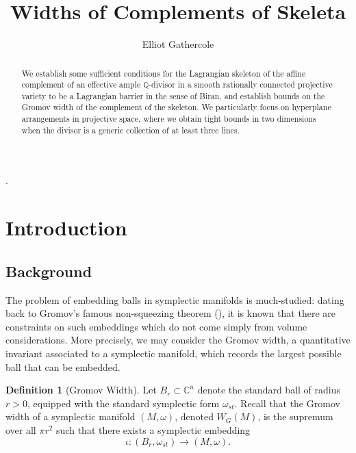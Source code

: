 \documentclass{article}
\title{Widths of Complements of Skeleta}
\date{}
\author{Elliot Gathercole}
\numberwithin{equation}{section}
\numberwithin{figure}{section}
\begin{document}
\newcommand{\Size}{\text{Size}}


\maketitle
\theoremstyle{plain}
\newtheorem{thm}{Theorem}


    {\topsep}{\topsep}              %
    {\itshape}                      %
    {}                              %
    {\bfseries}                     %
    {.}                             %
    { }                             %
    {}%
\theoremstyle{TheoremNum}
\newtheorem{thmn}{Theorem}

\theoremstyle{plain}
\newtheorem{prop}{Proposition}[section]
\newtheorem{cor}[prop]{Corollary}
\newtheorem{lem}[prop]{Lemma}

\theoremstyle{definition}
\newtheorem{defn}[prop]{Definition}
\newtheorem{ex}[prop]{Example}
\newtheorem{hyp}[prop]{Hypothesis}


\begin{abstract}
    We establish some sufficient conditions for the Lagrangian skeleton of the affine complement of an effective ample $\mathbb{Q}$-divisor in a smooth rationally connected projective variety to be a Lagrangian barrier in the sense of Biran, and establish bounds on the Gromov width of the complement of the skeleton. We particularly focus on hyperplane arrangements in projective space, where we obtain tight bounds in two dimensions when the divisor is a generic collection of at least three lines.
\end{abstract}

\section{Introduction}
\subsection{Background}
The problem of embedding balls in symplectic manifolds is much-studied: dating back to Gromov's famous non-squeezing theorem (\cite{Gro}), it is known that there are constraints on such embeddings which do not come simply from volume considerations. More precisely, we may consider the Gromov width, a quantitative invariant associated to a symplectic manifold, which records the largest possible ball that can be embedded.
\begin{defn}[Gromov Width]
Let $B_r\subset \mathbb{C}^n$ denote the standard ball of radius $r>0$, equipped with the standard symplectic form $\omega_{st}$. Recall that the Gromov width of a symplectic manifold $(M,\omega)$, denoted $W_G(M)$,  is the supremum over all $\pi r^2$ such that there exists a symplectic embedding
\begin{equation}
    \iota:(B_r,\omega_{st})\rightarrow (M,\omega).
\end{equation} 
\end{defn}
\end{document}
